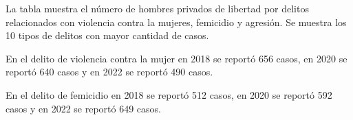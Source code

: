 \justifying La tabla muestra el número de hombres privados de libertad por delitos relacionados con violencia contra la mujeres, femicidio y agresión. Se muestra los 10 tipos de delitos con mayor cantidad de casos. 

En el delito de violencia contra la mujer en 2018 se reportó 656 casos, en 2020 se reportó 640 casos y en 2022 se reportó 490 casos. 

En el delito de femicidio en 2018 se reportó 512 casos, en 2020 se reportó 592 casos y en 2022 se reportó 649 casos. 

